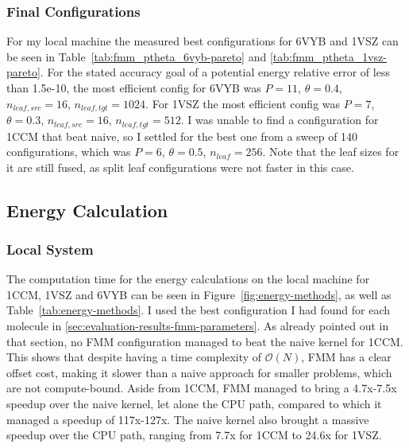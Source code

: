\subsubsection{Final Configurations}

For my local machine the measured best configurations for 6VYB and 1VSZ can be seen in Table~\ref{tab:fmm_ptheta_6vyb-pareto} and \ref{tab:fmm_ptheta_1vsz-pareto}.
For the stated accuracy goal of a potential energy relative error of less than 1.5e-10, the most efficient config for 6VYB was $P=11$, $\theta=0.4$, $n_{leaf,src} = 16$, $n_{leaf,tgt} = 1024$.
For 1VSZ the most efficient config was $P=7$, $\theta=0.3$, $n_{leaf,src} = 16$, $n_{leaf,tgt} = 512$.
I was unable to find a configuration for 1CCM that beat naive, so I settled for the best one from a sweep of 140 configurations, which was $P=6$, $\theta=0.5$, $n_{leaf} = 256$.
Note that the leaf sizes for it are still fused, as split leaf configurations were not faster in this case.

%





\FloatBarrier

\subsection{Energy Calculation}
\label{sec:evaluation-results-energy-calculation}

\subsubsection{Local System}

The computation time for the energy calculations on the local machine for 1CCM, 1VSZ and 6VYB can be seen in Figure~\ref{fig:energy-methods}, as well as Table~\ref{tab:energy-methods}.
I used the best configuration I had found for each molecule in \ref{sec:evaluation-results-fmm-parameters}.
As already pointed out in that section, no FMM configuration managed to beat the naive kernel for 1CCM.
This shows that despite having a time complexity of \(\mathcal{O}(N)\), FMM has a clear offset cost, making it slower than a naive approach for smaller problems, which are not compute-bound.
Aside from 1CCM, FMM managed to bring a 4.7x-7.5x speedup over the naive kernel, let alone the CPU path, compared to which it managed a speedup of 117x-127x.
The naive kernel also brought a massive speedup over the CPU path, ranging from 7.7x for 1CCM to 24.6x for 1VSZ.

